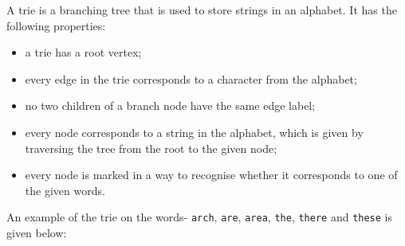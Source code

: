 \documentclass[a4paper, openany]{memoir}
\begin{document}
    A trie is a branching tree that is used to store strings in an alphabet. It has the following properties:
    \begin{itemize}
        \item a trie has a root vertex;
        \item every edge in the trie corresponds to a character from the alphabet;
        \item no two children of a branch node have the same edge label;
        \item every node corresponds to a string in the alphabet, which is given by traversing the tree from the root to the given node;
        \item every node is marked in a way to recognise whether it corresponds to one of the given words.
    \end{itemize}
    An example of the trie on the words- \texttt{arch}, \texttt{are}, \texttt{area}, \texttt{the}, \texttt{there} and \texttt{these} is given below:
\end{document}
